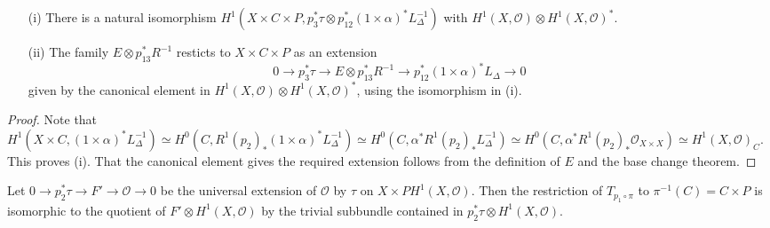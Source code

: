 \setcounter{theorem}{9}
\begin{lemma}\label{art05-lem6.10}
\begin{itemize}
\item[\rm(i)] There is a natural isomorphism $H^{1}(X\times C\times
P,p^{*}_{3}\tau\otimes p^{*}_{12}(1\times \alpha)^{*}L_{\Delta}^{-1})$
with $H^{1}(X,\mathscr{O})\otimes H^{1}(X,\mathscr{O})^{*}$. 

\item[\rm(ii)] The family $E\otimes p^{*}_{13}R^{-1}$ resticts to
$X\times C\times P$ as an extension 
$$
0\to p^{*}_{3}\tau\to E\otimes p^{*}_{13}R^{-1}\to
p^{*}_{12}(1\times \alpha)^{*}L_{\Delta}\to 0
$$
given by the canonical element in $H^{1}(X,\mathscr{O})\otimes
H^{1}(X,\mathscr{O})^{*}$, using the isomorphism in {\rm(i)}.
\end{itemize}
\end{lemma}

\begin{proof}
Note that $H^{1}(X\times C,(1\times \alpha)^{*}L^{-1}_{\Delta})\simeq
H^{0}(C,R^{1}(p_{2})_{*}(1\times \alpha)^{*}L^{-1}_{\Delta})\simeq
H^{0}(C, \alpha^{*}R^{1}(p_{2})_{*}L^{-1}_{\Delta})\simeq
H^{0}(C,\alpha^{*}R^{1}(p_{2})_{*}\mathscr{O}_{X\times X})\simeq
H^{1}(X,\mathscr{O})_{C}$. This proves (i). That the canonical element
gives the required extension follows from the definition of $E$ and
the base change theorem.
\end{proof}

\begin{proposition}\label{art05-prop6.11}
Let $0\to p^{*}_{2}\tau\to F'\to \mathscr{O}\to 0$ be the universal
extension of $\mathscr{O}$ by $\tau$ on $X\times
PH^{1}(X,\mathscr{O})$. Then the restriction of $T_{p_{1}\circ \pi}$
to $\pi^{-1}(C)=C\times P$ is isomorphic to the quotient of $F'\otimes
H^{1}(X,\mathscr{O})$ by the trivial subbundle contained in
$p^{*}_{2}\tau\otimes H^{1}(X,\mathscr{O})$.
\end{proposition}


